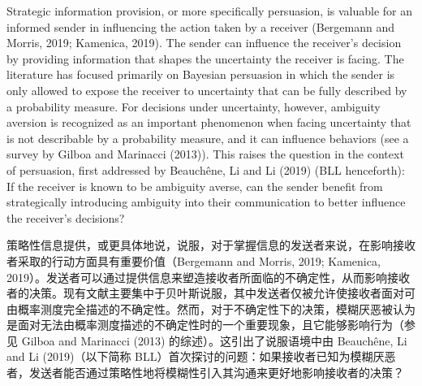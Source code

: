 \documentclass[12pt,a4paper]{article}
\theoremstyle{definition}
\theoremstyle{remark}
\newenvironment{original}{%
    \par\medskip\noindent%
    \begin{tcolorbox}[%
        colback=white,%
        colframe=black!50,%
        title=\textbf{Original English},%
        fonttitle=\small\bfseries,%
        left=0pt, right=0pt, top=2pt, bottom=2pt,%
        boxrule=0.5pt,%
        arc=0pt,%
        outer arc=0pt%
    ]%
    \small%
}{%
    \end{tcolorbox}%
}
\newenvironment{translation}{%
    \par\smallskip\noindent%
    \begin{tcolorbox}[%
        colback=blue!3!white,%
        colframe=blue!40!black,%
        title=\textbf{中文翻译},%
        fonttitle=\small\bfseries,%
        left=0pt, right=0pt, top=2pt, bottom=2pt,%
        boxrule=0.5pt,%
        arc=0pt,%
        outer arc=0pt%
    ]%
    \small\color{blue!60!black}%
}{%
    \end{tcolorbox}\medskip%
}
\begin{document}
\begin{original}
Strategic information provision, or more specifically persuasion, is valuable for an informed sender in influencing the action taken by a receiver (Bergemann and Morris, 2019; Kamenica, 2019). The sender can influence the receiver's decision by providing information that shapes the uncertainty the receiver is facing. The literature has focused primarily on Bayesian persuasion in which the sender is only allowed to expose the receiver to uncertainty that can be fully described by a probability measure. For decisions under uncertainty, however, ambiguity aversion is recognized as an important phenomenon when facing uncertainty that is not describable by a probability measure, and it can influence behaviors (see a survey by Gilboa and Marinacci (2013)). This raises the question in the context of persuasion, first addressed by Beauch\^{e}ne, Li and Li (2019) (BLL henceforth): If the receiver is known to be ambiguity averse, can the sender benefit from strategically introducing ambiguity into their communication to better influence the receiver's decisions?
\end{original}
\begin{translation}
策略性信息提供，或更具体地说，说服，对于掌握信息的发送者来说，在影响接收者采取的行动方面具有重要价值（Bergemann and Morris, 2019; Kamenica, 2019）。发送者可以通过提供信息来塑造接收者所面临的不确定性，从而影响接收者的决策。现有文献主要集中于贝叶斯说服，其中发送者仅被允许使接收者面对可由概率测度完全描述的不确定性。然而，对于不确定性下的决策，模糊厌恶被认为是面对无法由概率测度描述的不确定性时的一个重要现象，且它能够影响行为（参见 Gilboa and Marinacci (2013) 的综述）。这引出了说服语境中由 Beauch\^{e}ne, Li and Li (2019)（以下简称 BLL）首次探讨的问题：如果接收者已知为模糊厌恶者，发送者能否通过策略性地将模糊性引入其沟通来更好地影响接收者的决策？
\end{translation}
\end{document}

